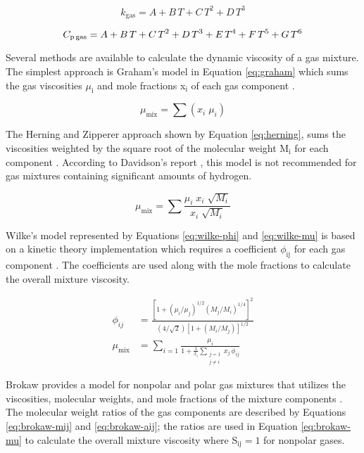 \begin{equation}\label{eq:thermlcond}
    k_\text{gas} = A + B\,T + C\,T^2 + D\,T^3
\end{equation}

\begin{equation}\label{eq:heatcap}
    C_\text{p\,gas} = A + B\,T + C\,T^2 + D\,T^3 + E\,T^4 + F\,T^5 + G\,T^6
\end{equation}

Several methods are available to calculate the dynamic viscosity of a gas mixture. The simplest approach is Graham's model in Equation \ref{eq:graham} which sums the gas viscosities $\mu_\text{i}$ and mole fractions x$_\text{i}$ of each gas component \cite{Graham-1846}.

\begin{equation}
    \mu_\text{mix} = \sum(x_i \; \mu_i)
    \label{eq:graham}
\end{equation}

\noindent The Herning and Zipperer approach shown by Equation \ref{eq:herning}, sums the viscosities weighted by the square root of the molecular weight M$_\text{i}$ for each component \cite{Herning-1936}. According to Davidson's report \cite{Davidson-1993}, this model is not recommended for gas mixtures containing significant amounts of hydrogen.

\begin{equation}
    \mu_\text{mix} = \sum \frac{\mu_i \; x_i \; \sqrt{M_i}}{x_i \; \sqrt{M_i}}
    \label{eq:herning}
\end{equation}

\noindent Wilke's model represented by Equations \ref{eq:wilke-phi} and \ref{eq:wilke-mu} is based on a kinetic theory implementation which requires a coefficient $\phi_\text{ij}$ for each gas component \cite{Wilke-1950}. The coefficients are used along with the mole fractions to calculate the overall mixture viscosity.

\begin{align}
    \phi_{ij} &= \frac{\left[1 + (\mu_i/\mu_j)^{1/2} (M_j/M_i)^{1/4}\right]^2}{(4/\sqrt{2}) \left[1 + (M_i/M_j)\right]^{1/2}} \label{eq:wilke-phi} \\
    \mu_{\text{mix}} &= \sum_{i=1} \frac{\mu_i}{1 + \frac{1}{x_i} \sum_{\substack{j=1 \\j \neq i}} x_j \, \phi_{ij}} \label{eq:wilke-mu}
\end{align}

\noindent Brokaw provides a model for nonpolar and polar gas mixtures that utilizes the viscosities, molecular weights, and mole fractions of the mixture components \cite{Brokaw-1968}. The molecular weight ratios of the gas components are described by Equations \ref{eq:brokaw-mij} and \ref{eq:brokaw-aij}; the ratios are used in Equation \ref{eq:brokaw-mu} to calculate the overall mixture viscosity where S$_\text{ij} = 1$ for nonpolar gases.

